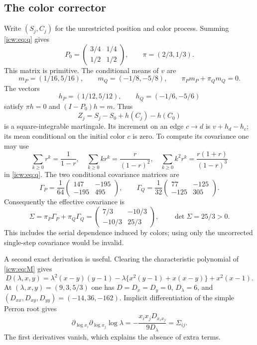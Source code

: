 \documentclass[11pt,letterpaper]{article}
\theoremstyle{remark}\newtheorem{remark}[theorem]{Remark}
\newcommand{\1}{\mathbf1}
\begin{document}
\subsection{The color corrector}\label{icw:sub:corrector}
Write $(S_j,C_j)$ for the unrestricted position and color process.
Summing \eqref{icw:eq:q} gives
\begin{equation}\label{icw:eq:color}
 P_0=\begin{pmatrix}3/4&1/4\\1/2&1/2\end{pmatrix},\qquad
 \pi=(2/3,1/3).
\end{equation}
This matrix is primitive. The conditional means of $v$ are
\[
 m_P=(1/16,5/16),\qquad m_Q=(-1/8,-5/8),\qquad
 \pi_Pm_P+\pi_Qm_Q=0.
\]
The vectors
\begin{equation}\label{icw:eq:h}
 h_P=(1/12,5/12),\qquad h_Q=(-1/6,-5/6)
\end{equation}
satisfy $\pi h=0$ and $(I-P_0)h=m$. Thus
\[
 Z_j=S_j-S_0+h(C_j)-h(C_0)
\]
is a square-integrable martingale. Its increment on an edge $c\to d$ is $v+h_d-h_c$; its mean conditional
on the initial color $c$ is zero. To compute its covariance one may use
\[
 \sum_{k\ge0}r^k=\frac1{1-r},\quad
 \sum_{k\ge0}kr^k=\frac r{(1-r)^2},\quad
 \sum_{k\ge0}k^2r^k=\frac{r(1+r)}{(1-r)^3}
\]
in \eqref{icw:eq:q}. The two conditional covariance matrices are
\[
 \Gamma_P=\frac1{64}\begin{pmatrix}147&-195\\-195&495\end{pmatrix},
 \qquad
 \Gamma_Q=\frac1{32}\begin{pmatrix}77&-125\\-125&305\end{pmatrix}.
\]
Consequently the effective covariance is
\begin{equation}\label{icw:eq:Sigma}
 \Sigma=\pi_P\Gamma_P+\pi_Q\Gamma_Q
 =\begin{pmatrix}7/3&-10/3\\-10/3&25/3\end{pmatrix},
 \qquad \det\Sigma=25/3>0.
\end{equation}
This includes the serial dependence induced by colors; using only the
uncorrected single-step covariance would be invalid.

A second exact derivation is useful. Clearing the characteristic
polynomial of \eqref{icw:eq:M} gives
\[
 D(\lambda,x,y)=\lambda^2(x-y)(y-1)
  -\lambda\{x^2(y-1)+x(x-y)\}+x^2(x-1).
\]
At $(\lambda,x,y)=(9,3,5/3)$ one has
$D=D_x=D_y=0$, $D_\lambda=6$, and
$(D_{xx},D_{xy},D_{yy})=(-14,36,-162)$.
Implicit differentiation of the simple Perron root gives
\[
 \partial_{\log x_i}\partial_{\log x_j}\log\lambda
 =-\frac{x_ix_jD_{x_ix_j}}{9D_\lambda}=\Sigma_{ij}.
\]
The first derivatives vanish, which explains the absence of extra terms.
\end{document}
